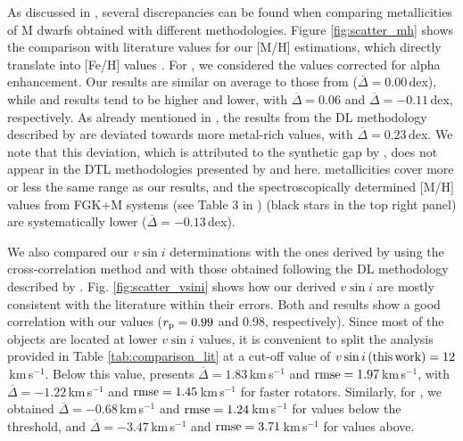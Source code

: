 As discussed in \citet{passegger2022}, several discrepancies can be found when comparing metallicities of M dwarfs obtained with different methodologies. Figure \ref{fig:scatter_mh} shows the comparison with literature values for our [M/H] estimations, which directly translate into [Fe/H] values \citep{pass20,passegger2022}. For , we considered the values corrected for alpha enhancement. Our results are similar on average to those from  ($\overline{\Delta}=0.00$\,dex), while  and  results tend to be higher and lower, with $\overline{\Delta}=0.06$ and $\overline{\Delta}=-0.11$\,dex, respectively. As already mentioned in \citet{passegger2022}, the results from the DL methodology described by  are deviated towards more metal-rich values, with $\overline{\Delta}=0.23$\,dex. We note that this deviation, which is attributed to the synthetic gap by , does not appear in the DTL methodologies presented by  and here.  metallicities cover more or less the same range as our results, and the spectroscopically determined [M/H] values from FGK+M systems (see Table 3 in ) (black stars in the top right panel) are systematically lower ($\overline{\Delta}=-0.13$\,dex).

We also compared our $\textit{v}\sin{i}$ determinations with the ones derived by \citet{reiners2018} using the cross-correlation method and with those obtained following the DL methodology described by . Fig. \ref{fig:scatter_vsini} shows how our derived $\textit{v}\sin{i}$ are mostly consistent with the literature within their errors. Both  and \citet{reiners2018} results show a good correlation with our values ($r_{\rm p}=0.99$ and 0.98, respectively). Since most of the objects are located at lower $\textit{v}\sin{i}$ values, it is convenient to split the analysis provided in Table \ref{tab:comparison_lit} at a cut-off value of $v\sin{i}\,{\rm (this\,work)}=12$\,km\,s$^{-1}$. Below this value,  presents $\overline{\Delta}=1.83$\,km\,s$^{-1}$ and ${\rm rmse}=1.97$\,km\,s$^{-1}$, with $\overline{\Delta}=-1.22$\,km\,s$^{-1}$ and ${\rm rmse}=1.45$\,km\,s$^{-1}$ for faster rotators. Similarly, for \citet{reiners2018}, we obtained $\overline{\Delta}=-0.68$\,km\,s$^{-1}$ and ${\rm rmse}=1.24$\,km\,s$^{-1}$ for values below the threshold, and $\overline{\Delta}=-3.47$\,km\,s$^{-1}$ and ${\rm rmse}=3.71$\,km\,s$^{-1}$ for values above.


